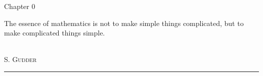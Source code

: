 \begin{titlepage}
\noindent
\titlefont Chapter 0\par
\epigraph{The essence of mathematics is not to make simple things complicated, but to make complicated things simple.}%
{\textit{}\\ \textsc{S. Gudder}}
\null\vfill
\vspace*{1cm}
\noindent
\hfill
\begin{minipage}{0.35\linewidth}
    \begin{flushright}
        \printauthor
    \end{flushright}
\end{minipage}
%
\begin{minipage}{0.02\linewidth}
    \rule{1pt}{60pt}
\end{minipage}
\titlepagedecoration

\end{titlepage}
